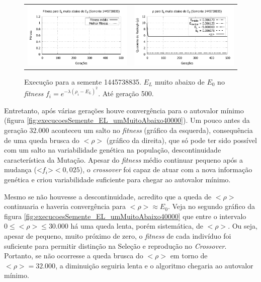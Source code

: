 	\begin{figure}[htbp]
	\centering
  \begin{tabular}{@{}cc@{}}	
		\includegraphics[width=.45\textwidth]{figs/resultados/variandoELSemente/T4_S-1445738835_fitness.pdf} &
    \includegraphics[width=.45\textwidth]{figs/resultados/variandoELSemente/T4_S-1445738835_rho.pdf}
  \end{tabular}
  \caption{Execução para a semente 1445738835. $E_L$ muito abaixo de $E_0$ no \textit{fitness} $f_i = e^{-\lambda(\rho_i - E_L)^2}$. Até geração 500.}
	\label{fig:execucoesSemente_EL_umMuitoAbaixo500}
	\end{figure}
		
	Entretanto, após várias gerações houve convergência para o autovalor mínimo (figura \ref{fig:execucoesSemente_EL_umMuitoAbaixo40000}). Um pouco antes da geração 32.000 aconteceu um salto no \emph{fitness} (gráfico da esquerda), consequência de uma queda brusca do $<\rho>$ (gráfico da direita), que só pode ter sido possível com um salto na variabilidade genética na população, descontinuidade característica da Mutação. Apesar do \emph{fitness} médio continuar pequeno após a mudança (<$f_i$>$< 0,025$), o \emph{crossover} foi capaz de atuar com a nova informação genética e criou variabilidade suficiente para chegar ao autovalor mínimo.
	
	Mesmo se não houvesse a descontinuidade, acredito que a queda de $<\rho>$ continuaria e haveria convergência para $<\rho> \approx E_0$. Veja no segundo gráfico da figura \ref{fig:execucoesSemente_EL_umMuitoAbaixo40000} que entre o intervalo $0 \leq <\rho> \leq 30.000$ há uma queda lenta, porém sistemática, de $<\rho>$. Ou seja, apesar de pequeno, muito próximo de zero, o \emph{fitness} de cada indivíduo foi suficiente para permitir distinção na Seleção e reprodução no \emph{Crossover}. Portanto, se não ocorresse a queda brusca do $<\rho>$ em torno de $<\rho> = 32.000$, a diminuição seguiria lenta e o algoritmo chegaria ao autovalor mínimo.
	
